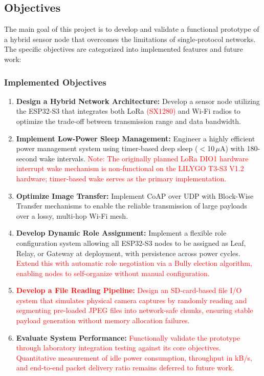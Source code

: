 \documentclass[12pt,a4paper]{article}
\newcommand{\changed}[1]{\textcolor{red}{#1}}
\begin{document}
\subsection{Objectives}

The main goal of this project is to develop and validate a functional prototype of a hybrid sensor node that overcomes the limitations of single-protocol networks. The specific objectives are categorized into implemented features and future work:

\subsubsection{Implemented Objectives}

\begin{enumerate}
    \item \textbf{Design a Hybrid Network Architecture:} Develop a sensor node utilizing the ESP32-S3 that integrates both LoRa \changed{(SX1280)} and Wi-Fi radios to optimize the trade-off between transmission range and data bandwidth.

    \item \textbf{Implement Low-Power Sleep Management:} Engineer a highly efficient power management system using timer-based deep sleep ($<$10\,$\mu$A) with 180-second wake intervals. \changed{Note: The originally planned LoRa DIO1 hardware interrupt wake mechanism is non-functional on the LILYGO T3-S3 V1.2 hardware; timer-based wake serves as the primary implementation.}

    \item \textbf{Optimize Image Transfer:} Implement CoAP over UDP with Block-Wise Transfer mechanisms to enable the reliable transmission of large payloads over a lossy, multi-hop Wi-Fi mesh.

    \item \textbf{Develop Dynamic Role Assignment:} Implement a flexible role configuration system allowing all ESP32-S3 nodes to be assigned as Leaf, Relay, or Gateway at deployment, with persistence across power cycles. \changed{Extend this with automatic role negotiation via a Bully election algorithm, enabling nodes to self-organize without manual configuration.}

    \item \changed{\textbf{Develop a File Reading Pipeline:} Design an SD-card-based file I/O system that simulates physical camera captures by randomly reading and segmenting pre-loaded JPEG files into network-safe chunks, ensuring stable payload generation without memory allocation failures.}

    \item \textbf{Evaluate System Performance:} \changed{Functionally validate the prototype through laboratory integration testing against its core objectives. Quantitative measurement of idle power consumption, throughput in kB/s, and end-to-end packet delivery ratio remains deferred to future work.}
\end{enumerate}
\end{document}

